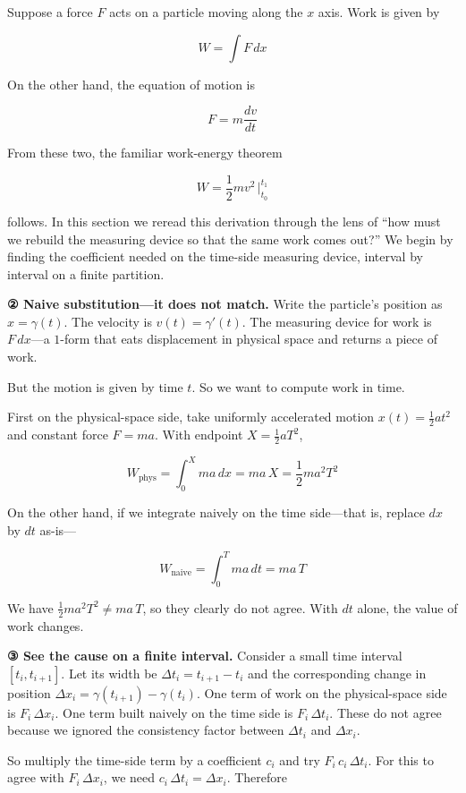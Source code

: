 Suppose a force \(F\) acts on a particle moving along the \(x\) axis.
Work is given by

\[W = \int F\,dx\]

On the other hand, the equation of motion is

\[F = m\frac{dv}{dt}\]

From these two, the familiar work-energy theorem

\[W = \frac{1}{2}mv^2\,\Big|_{t_0}^{t_1}\]

follows. In this section we reread this derivation through the lens of
``how must we rebuild the measuring device so that the same work comes
out?'' We begin by finding the coefficient needed on the time-side
measuring device, interval by interval on a finite partition.

\textbf{② Naive substitution—it does not match.} Write the particle's
position as \(x = \gamma(t)\). The velocity is \(v(t)=\gamma'(t)\). The
measuring device for work is \(F\,dx\)---a \(1\)-form that eats
displacement in physical space and returns a piece of work.

But the motion is given by time \(t\). So we want to compute work in
time.

First on the physical-space side, take uniformly accelerated motion
\(x(t) = \frac{1}{2}at^2\) and constant force \(F = ma\). With endpoint
\(X = \frac{1}{2}aT^2\),

\[W_{\text{phys}} = \int_0^X ma\,dx = ma\,X = \frac{1}{2}ma^2T^2\]

On the other hand, if we integrate naively on the time side---that is,
replace \(dx\) by \(dt\) as-is---

\[W_{\text{naive}} = \int_0^T ma\,dt = ma\,T\]

We have \(\frac{1}{2}ma^2T^2 \neq ma\,T\), so they clearly do not agree.
With \(dt\) alone, the value of work changes.

\textbf{③ See the cause on a finite interval.} Consider a small time
interval \([t_i, t_{i+1}]\). Let its width be
\(\Delta t_i = t_{i+1} - t_i\) and the corresponding change in position
\(\Delta x_i = \gamma(t_{i+1}) - \gamma(t_i)\). One term of work on the
physical-space side is \(F_i\,\Delta x_i\). One term built naively on
the time side is \(F_i\,\Delta t_i\). These do not agree because we
ignored the consistency factor between \(\Delta t_i\) and
\(\Delta x_i\).

So multiply the time-side term by a coefficient \(c_i\) and try
\(F_i\,c_i\,\Delta t_i\). For this to agree with \(F_i\,\Delta x_i\), we
need \(c_i\,\Delta t_i = \Delta x_i\). Therefore


